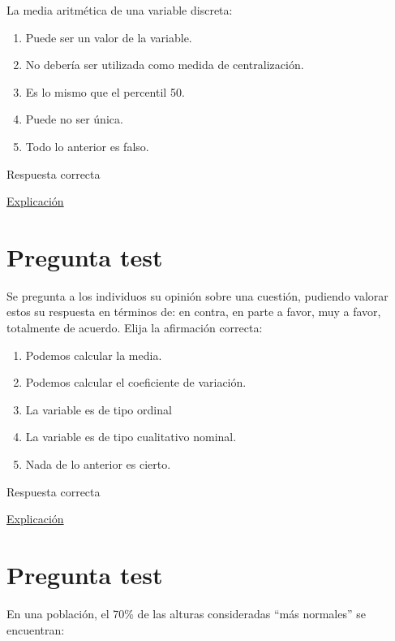 \documentclass[
]{book}
\providecommand{\tightlist}{%
  \setlength{\itemsep}{0pt}\setlength{\parskip}{0pt}}
\begin{document}
La media aritmética de una variable discreta:

\begin{enumerate}
\def\labelenumi{\alph{enumi})}
\tightlist
\item
  Puede ser un valor de la variable.
\item
  No debería ser utilizada como medida de centralización.
\item
  Es lo mismo que el percentil 50.
\item
  Puede no ser única.
\item
  Todo lo anterior es falso.
\end{enumerate}

Respuesta correcta

\href{https://1fjmanzano.github.io/bioestadistica/medidas-de-posicio\%CC\%81n-dispersio\%CC\%81n-y-forma.html\#medidas-de-posicio\%CC\%81n-centrales}{Explicación}

\hypertarget{pregunta-test-45}{%
\section{Pregunta test}\label{pregunta-test-45}}

Se pregunta a los individuos su opinión sobre una cuestión, pudiendo valorar estos su respuesta en términos de: en contra, en parte a favor, muy a favor, totalmente de acuerdo. Elija la afirmación correcta:

\begin{enumerate}
\def\labelenumi{\alph{enumi})}
\tightlist
\item
  Podemos calcular la media.
\item
  Podemos calcular el coeficiente de variación.
\item
  La variable es de tipo ordinal
\item
  La variable es de tipo cualitativo nominal.
\item
  Nada de lo anterior es cierto.
\end{enumerate}

Respuesta correcta

\href{https://1fjmanzano.github.io/bioestadistica/tipos-de-variables.html}{Explicación}

\hypertarget{pregunta-test-46}{%
\section{Pregunta test}\label{pregunta-test-46}}

En una población, el 70\% de las alturas consideradas ``más normales'' se encuentran:
\end{document}
